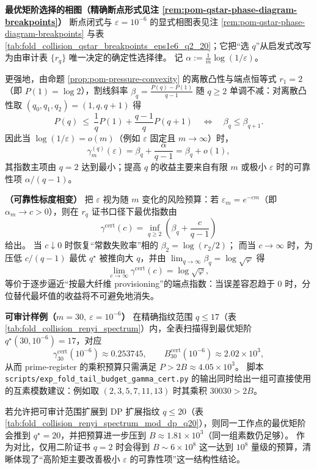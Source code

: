 \begin{remark}
\medskip\noindent\textbf{最优矩阶选择的相图（精确断点形式见注 \ref{rem:pom-qstar-phase-diagram-breakpoints}）}
断点闭式与 \(\varepsilon=10^{-6}\) 的显式相图表见注 \ref{rem:pom-qstar-phase-diagram-breakpoints} 与表 \ref{tab:fold_collision_qstar_breakpoints_eps1e6_q2_20}；它把“选 \(q\)”从启发式改写为由审计表 \(\{r_q\}\) 唯一决定的确定性选择律。
记 \(\alpha:=\frac{1}{m}\log(1/\varepsilon)\)。

更强地，由命题 \ref{prop:pom-pressure-convexity} 的离散凸性与端点恒等式 \(r_1=2\)（即 \(P(1)=\log 2\)），割线斜率
\(
\beta_q=\frac{P(q)-P(1)}{q-1}
\)
随 \(q\ge 2\) 单调不减：对离散凸性取 \((q_0,q_1,q_2)=(1,q,q+1)\) 得
\[
P(q)\ \le\ \frac{1}{q}P(1)+\frac{q-1}{q}P(q+1)
\quad\Longleftrightarrow\quad
\beta_q\le \beta_{q+1}.
\]
因此当 \(\log(1/\varepsilon)=o(m)\)（例如 \(\varepsilon\) 固定且 \(m\to\infty\)）时，
\[
\gamma_m^{(q)}(\varepsilon)=\beta_q+\frac{\alpha}{q-1}=\beta_q+o(1),
\]
其指数主项由 \(q=2\) 达到最小；提高 \(q\) 的收益主要来自有限 \(m\) 或极小 \(\varepsilon\) 时的可靠性项 \(\alpha/(q-1)\)。

\medskip\noindent\textbf{（可靠性标度相变）}
把 \(\varepsilon\) 视为随 \(m\) 变化的风险预算：若 \(\varepsilon_m=e^{-c m}\)（即 \(\alpha_m\to c>0\)），则在 \(r_q\) 证书口径下最优指数由
\[
\gamma^{\mathrm{cert}}(c)
=\inf_{q\ge 2}\left(\beta_q+\frac{c}{q-1}\right)
\]
给出。
当 \(c\downarrow 0\) 时恢复“常数失败率”相的 \(\beta_2=\log(r_2/2)\)；
而当 \(c\to\infty\) 时，为压低 \(c/(q-1)\) 最优 \(q^\star\) 被推向大 \(q\)，并由 \(\lim_{q\to\infty}\beta_q=\log\sqrt{\varphi}\) 得
\[
\lim_{c\to\infty}\gamma^{\mathrm{cert}}(c)=\log\sqrt{\varphi},
\]
等价于逐步逼近“按最大纤维 provisioning”的端点指数：当误差容忍趋于 0 时，分位替代最坏值的收益将不可避免地消失。

\medskip\noindent\textbf{可审计样例（\(m=30,\ \varepsilon=10^{-6}\)）}
在精确指纹范围 \(q\le 17\)（表 \ref{tab:fold_collision_renyi_spectrum}）内，全表扫描得到最优矩阶 \(q^\star(30,10^{-6})=17\)，对应
\[
\gamma^{\mathrm{cert}}_{30}(10^{-6})\approx 0.253745,\qquad
B^{\mathrm{cert}}_{30}(10^{-6})\approx 2.02\times 10^3,
\]
从而 prime-register 的乘积预算只需满足 \(P>2B\approx 4.05\times 10^3\)。
脚本 \texttt{scripts/exp\_fold\_tail\_budget\_gamma\_cert.py} 的输出同时给出一组可直接使用的互素模数建议：例如取 \((2,3,5,7,11,13)\) 时其乘积 \(30030>2B\)。
\par
若允许把可审计范围扩展到 DP 扩展指纹 \(q\le 20\)（表 \ref{tab:fold_collision_renyi_spectrum_mod_dp_q20}），则同一工作点的最优矩阶会推到 \(q^\star=20\)，并把预算进一步压到 \(B\approx 1.81\times 10^3\)（同一组素数仍足够）。
作为对比，仅用二阶证书 \(q=2\) 时会得到 \(B\sim 6\times 10^8\) 这一达到 $10^8$ 量级的预算，清晰体现了“高阶矩主要改善极小 \(\varepsilon\) 的可靠性项”这一结构性结论。


\end{remark}
